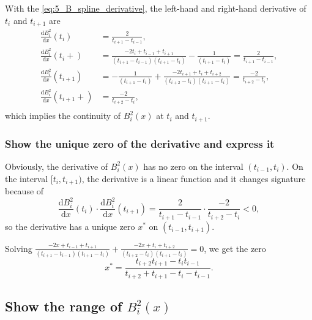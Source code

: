 \documentclass[a4paper]{article}
\begin{document}
With the \cref{eq:5_B_spline_derivative}, the left-hand and right-hand derivative of $t_i$ and $t_{i + 1}$ are
\begin{equation}
  \begin{aligned}
    \frac{\mathrm{d}B_i^2}{\mathrm{d}x}(t_i) &= \frac{2}{t_{i + 1} - t_{i - 1}}, \\ 
    \frac{\mathrm{d}B_i^2}{\mathrm{d}x}(t_i+) &= \frac{-2t_i + t_{i - 1} + t_{i + 1}}{(t_{i + 1} - t_{i - 1})(t_{i + 1} - t_i)} - \frac{1}{(t_{i + 1} - t_i)} = \frac{2}{t_{i + 1} - t_{i - 1}}, \\ 
    \frac{\mathrm{d}B_i^2}{\mathrm{d}x}(t_{i + 1}) &= -\frac{1}{(t_{i + 1} - t_i)} + \frac{-2t_{i + 1} + t_i + t_{i + 2}}{(t_{i + 2} - t_i)(t_{i + 1} - t_i)} = \frac{-2}{t_{i + 2} - t_i}, \\
    \frac{\mathrm{d}B_i^2}{\mathrm{d}x}(t_{i + 1}+) &= \frac{-2}{t_{i + 2} - t_i}, \\
  \end{aligned}
  \label{eq:5_B_spline_derivative_at_knots}
\end{equation}
which implies the continuity of $B_i^2(x)$ at $t_i$ and $t_{i + 1}$.

\subsubsection{Show the unique zero of the derivative and express it}

Obviously, the derivative of $B_i^2(x)$ has no zero on the interval $(t_{i - 1}, t_i)$. On the interval $[t_i, t_{i + 1})$, the derivative is a linear function and it changes signature because of 
\begin{equation}
  \frac{\mathrm{d}B_i^2}{\mathrm{d}x}(t_i) \cdot \frac{\mathrm{d}B_i^2}{\mathrm{d}x}(t_{i + 1}) = \frac{2}{t_{i + 1} - t_{i - 1}} \cdot \frac{-2}{t_{i + 2} - t_i} < 0,
  \label{eq:5_B_spline_derivative_sign}
\end{equation}
so the derivative has a unique zero $x^*$ on $(t_{i - 1}, t_{i + 1})$.

Solving $\frac{-2x + t_{i - 1} + t_{i + 1}}{(t_{i + 1} - t_{i - 1})(t_{i + 1} - t_i)} + \frac{-2x + t_i + t_{i + 2}}{(t_{i + 2} - t_i)(t_{i + 1} - t_i)} = 0$, we get the zero
\begin{equation}
  x^* = \frac{t_{i + 2}t_{i + 1} - t_it_{i - 1}}{t_{i + 2} + t_{i + 1} - t_i - t_{i - 1}}.
  \label{eq:5_B_spline_zero_of_derivative}
\end{equation}

\subsection{Show the range of $B_i^2(x)$}
\end{document}
